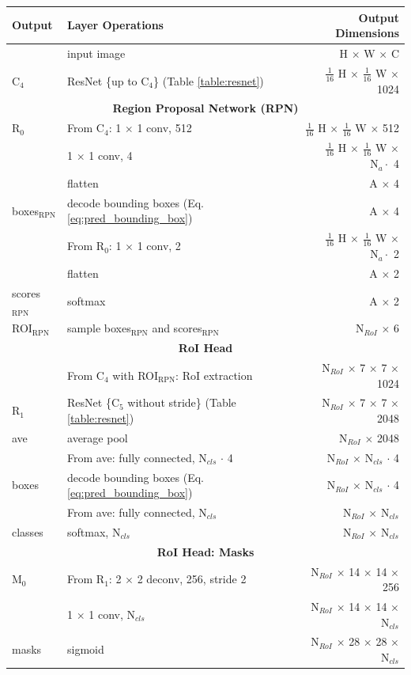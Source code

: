 {
\begin{table}[t]
\centering
\begin{tabular}{llr}
\toprule
\textbf{Output} & \textbf{Layer Operations} & \textbf{Output Dimensions} \\
\midrule\midrule
& input image & H $\times$ W $\times$ C \\
\midrule
C$_4$ & ResNet \{up to C$_4$\} (Table \ref{table:resnet})  & $\tfrac{1}{16}$ H $\times$ $\tfrac{1}{16}$ W $\times$ 1024 \\
\midrule
\multicolumn{3}{c}{\textbf{Region Proposal Network (RPN)}}\\
\midrule
R$_0$ & From C$_4$: 1 $\times$ 1 conv, 512 & $\tfrac{1}{16}$ H $\times$ $\tfrac{1}{16}$ W $\times$ 512 \\
& 1 $\times$ 1 conv, 4 & $\tfrac{1}{16}$ H $\times$ $\tfrac{1}{16}$ W $\times$ $\text{N}_a \cdot$ 4 \\
& flatten & A $\times$ 4 \\
boxes$_{\mathrm{RPN}}$ & decode bounding boxes (Eq. \ref{eq:pred_bounding_box}) & A $\times$ 4\\
& From R$_0$: 1 $\times$ 1 conv, 2 & $\tfrac{1}{16}$ H $\times$ $\tfrac{1}{16}$ W $\times$ $\text{N}_a \cdot$ 2 \\
& flatten & A $\times$ 2 \\
scores$_{\mathrm{RPN}}$& softmax & A $\times$ 2 \\
ROI$_{\mathrm{RPN}}$ & sample boxes$_{\mathrm{RPN}}$ and scores$_{\mathrm{RPN}}$ & N$_{RoI}$ $\times$ 6 \\
\midrule
\multicolumn{3}{c}{\textbf{RoI Head}}\\
\midrule
& From C$_4$ with ROI$_{\mathrm{RPN}}$: RoI extraction & N$_{RoI}$ $\times$ 7 $\times$ 7 $\times$ 1024 \\
R$_1$& ResNet \{C$_5$ without stride\} (Table \ref{table:resnet})  & N$_{RoI}$ $\times$ 7 $\times$ 7 $\times$ 2048 \\
ave & average pool & N$_{RoI}$ $\times$ 2048 \\
& From ave: fully connected, N$_{cls}$ $\cdot$ 4 & N$_{RoI}$ $\times$ N$_{cls}$ $\cdot$ 4\\
boxes & decode bounding boxes (Eq. \ref{eq:pred_bounding_box}) & N$_{RoI}$ $\times$ N$_{cls}$ $\cdot$ 4\\
& From ave: fully connected, N$_{cls}$ & N$_{RoI}$ $\times$ N$_{cls}$ \\
classes& softmax, N$_{cls}$ & N$_{RoI}$ $\times$ N$_{cls}$ \\
\midrule
\multicolumn{3}{c}{\textbf{RoI Head: Masks}}\\
\midrule
M$_0$ & From R$_1$: 2 $\times$ 2 deconv, 256, stride 2 & N$_{RoI}$ $\times$ 14 $\times$ 14 $\times$ 256 \\
& 1 $\times$ 1 conv, N$_{cls}$ & N$_{RoI}$ $\times$ 14 $\times$ 14 $\times$ N$_{cls}$ \\
masks & sigmoid & N$_{RoI}$ $\times$ 28 $\times$ 28 $\times$ N$_{cls}$ \\


\end{tabular}
\end{table}}
